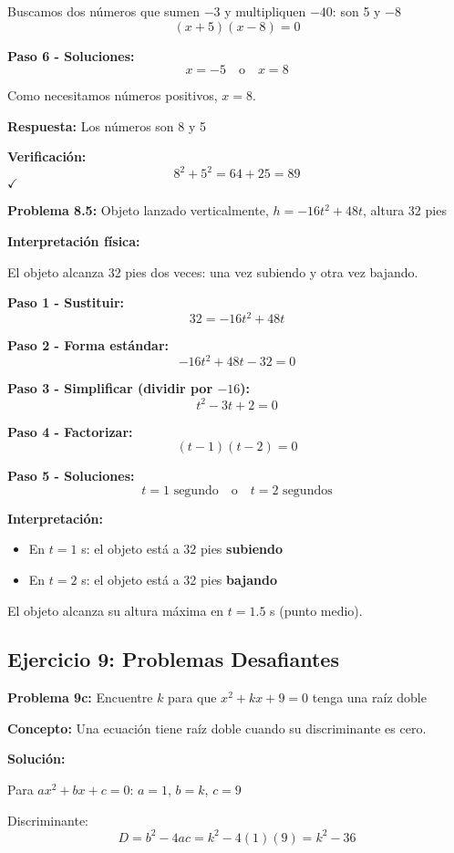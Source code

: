 Buscamos dos números que sumen $-3$ y multipliquen $-40$: son 5 y $-8$
$$(x + 5)(x - 8) = 0$$

\textbf{Paso 6 - Soluciones:}
$$x = -5 \quad \text{o} \quad x = 8$$

Como necesitamos números positivos, $x = 8$.

\textbf{Respuesta:} Los números son 8 y 5

\textbf{Verificación:}
$$8^2 + 5^2 = 64 + 25 = 89$$ $\checkmark$

\textbf{Problema 8.5:} Objeto lanzado verticalmente, $h = -16t^2 + 48t$, altura 32 pies

\textbf{Interpretación física:}

El objeto alcanza 32 pies dos veces: una vez subiendo y otra vez bajando.

\textbf{Paso 1 - Sustituir:}
$$32 = -16t^2 + 48t$$

\textbf{Paso 2 - Forma estándar:}
$$-16t^2 + 48t - 32 = 0$$

\textbf{Paso 3 - Simplificar (dividir por $-16$):}
$$t^2 - 3t + 2 = 0$$

\textbf{Paso 4 - Factorizar:}
$$(t - 1)(t - 2) = 0$$

\textbf{Paso 5 - Soluciones:}
$$t = 1 \text{ segundo} \quad \text{o} \quad t = 2 \text{ segundos}$$

\textbf{Interpretación:}
\begin{itemize}
\item En $t = 1$ s: el objeto está a 32 pies \textbf{subiendo}
\item En $t = 2$ s: el objeto está a 32 pies \textbf{bajando}
\end{itemize}

El objeto alcanza su altura máxima en $t = 1.5$ s (punto medio).


\subsection*{Ejercicio 9: Problemas Desafiantes}

\textbf{Problema 9c:} Encuentre $k$ para que $x^2 + kx + 9 = 0$ tenga una raíz doble

\textbf{Concepto:} Una ecuación tiene raíz doble cuando su discriminante es cero.

\textbf{Solución:}

Para $ax^2 + bx + c = 0$: $a = 1$, $b = k$, $c = 9$

Discriminante:
$$D = b^2 - 4ac = k^2 - 4(1)(9) = k^2 - 36$$

